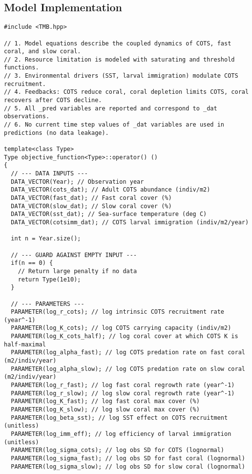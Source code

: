 \subsection{Model Implementation}
\begin{lstlisting}
#include <TMB.hpp>

// 1. Model equations describe the coupled dynamics of COTS, fast coral, and slow coral.
// 2. Resource limitation is modeled with saturating and threshold functions.
// 3. Environmental drivers (SST, larval immigration) modulate COTS recruitment.
// 4. Feedbacks: COTS reduce coral, coral depletion limits COTS, coral recovers after COTS decline.
// 5. All _pred variables are reported and correspond to _dat observations.
// 6. No current time step values of _dat variables are used in predictions (no data leakage).

template<class Type>
Type objective_function<Type>::operator() ()
{
  // --- DATA INPUTS ---
  DATA_VECTOR(Year); // Observation year
  DATA_VECTOR(cots_dat); // Adult COTS abundance (indiv/m2)
  DATA_VECTOR(fast_dat); // Fast coral cover (%)
  DATA_VECTOR(slow_dat); // Slow coral cover (%)
  DATA_VECTOR(sst_dat); // Sea-surface temperature (deg C)
  DATA_VECTOR(cotsimm_dat); // COTS larval immigration (indiv/m2/year)

  int n = Year.size();

  // --- GUARD AGAINST EMPTY INPUT ---
  if(n == 0) {
    // Return large penalty if no data
    return Type(1e10);
  }

  // --- PARAMETERS ---
  PARAMETER(log_r_cots); // log intrinsic COTS recruitment rate (year^-1)
  PARAMETER(log_K_cots); // log COTS carrying capacity (indiv/m2)
  PARAMETER(log_K_cots_half); // log coral cover at which COTS K is half-maximal
  PARAMETER(log_alpha_fast); // log COTS predation rate on fast coral (m2/indiv/year)
  PARAMETER(log_alpha_slow); // log COTS predation rate on slow coral (m2/indiv/year)
  PARAMETER(log_r_fast); // log fast coral regrowth rate (year^-1)
  PARAMETER(log_r_slow); // log slow coral regrowth rate (year^-1)
  PARAMETER(log_K_fast); // log fast coral max cover (%)
  PARAMETER(log_K_slow); // log slow coral max cover (%)
  PARAMETER(log_beta_sst); // log SST effect on COTS recruitment (unitless)
  PARAMETER(log_imm_eff); // log efficiency of larval immigration (unitless)
  PARAMETER(log_sigma_cots); // log obs SD for COTS (lognormal)
  PARAMETER(log_sigma_fast); // log obs SD for fast coral (lognormal)
  PARAMETER(log_sigma_slow); // log obs SD for slow coral (lognormal)


\end{lstlisting}
